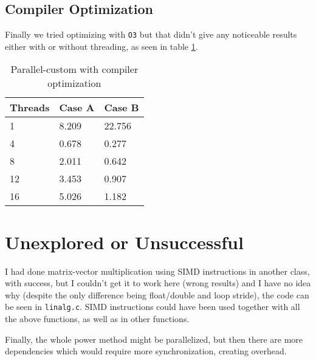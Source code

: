 \documentclass[a4paper, 11pt]{article}
\begin{document}
\subsection{Compiler Optimization}

Finally we tried optimizing with \texttt{O3} but that didn't give any noticeable results either with or without threading, as seen in table \ref{table:parall-custom-optim}.

\begin{table}[!h]
\centering
\begin{tabular}{|l|l|l|}
\hline
\textbf{Threads} & \textbf{Case A} & \textbf{Case B} \\ \hline
1       & 8.209  & 22.756 \\ \hline
4       & 0.678  & 0.277  \\ \hline
8       & 2.011  & 0.642  \\ \hline
12      & 3.453  & 0.907  \\ \hline
16      & 5.026  & 1.182  \\ \hline
\end{tabular}
\caption{Parallel-custom with compiler optimization}
\label{table:parall-custom-optim}
\end{table}

\section{Unexplored or Unsuccessful}

I had done matrix-vector multiplication using SIMD instructions in another class, with success, but I couldn't get it to work here (wrong results) and I have no idea why (despite the only difference being float/double and loop stride), the code can be seen in \texttt{linalg.c}. SIMD instructions could have been used together with all the above functions, as well as in other functions.

Finally, the whole power method might be parallelized, but then there are more dependencies which would require more synchronization, creating overhead.
\end{document}
